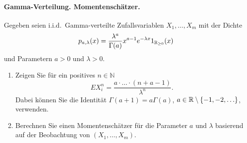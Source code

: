 \paragraph{Gamma-Verteilung. Momentenschätzer.}
Gegeben seien i.i.d.\ Gamma-verteilte Zufallsvariablen $X_1,\ldots,X_m$ mit der Dichte
\begin{equation*}
    p_{a,\lambda}(x) = \frac{\lambda^a}{\Gamma(a)}x^{a-1}e^{-\lambda x} 1_{\mathbb R_{\geq 0}}(x)
\end{equation*}
und Parametern $a>0$ und $\lambda>0$.
\begin{enumerate}
    \item Zeigen Sie für ein positives $n\in\mathbb N$
        \begin{equation*}
            E X_i^n = \frac{a\cdot\ldots\cdot (n+a-1)}{\lambda^n}.
        \end{equation*}
        Dabei können Sie die Identität 
        $\Gamma(a+1)=a \Gamma(a)$, $a\in\mathbb R \setminus \left\{ -1,-2,\ldots \right\}$, verwenden.
    \item Berechnen Sie einen Momentenschätzer für die Parameter $a$ und $\lambda$ basierend auf
        der Beobachtung von $\left( X_1,\ldots,X_m \right)$. 
\end{enumerate}

